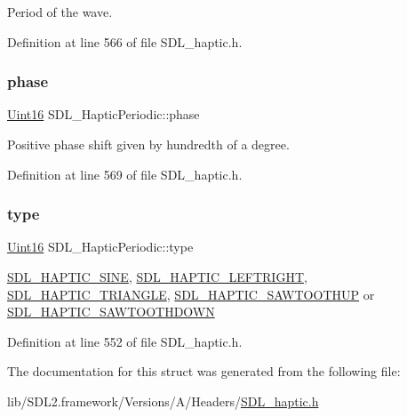 Period of the wave. 

Definition at line 566 of file S\+D\+L\+\_\+haptic.\+h.

\mbox{\label{struct_s_d_l___haptic_periodic_a25e8c6aebc78bd74b9343fa228d25d8f}} 
\subsubsection{\texorpdfstring{phase}{phase}}
{\footnotesize\ttfamily \mbox{\hyperlink{_s_d_l__stdinc_8h_a31fcc0a076c9068668173ee26d33e42b}{Uint16}} S\+D\+L\+\_\+\+Haptic\+Periodic\+::phase}

Positive phase shift given by hundredth of a degree. 

Definition at line 569 of file S\+D\+L\+\_\+haptic.\+h.

\mbox{\label{struct_s_d_l___haptic_periodic_ac53c5725e8cff012e9b90e01b7110869}} 
\subsubsection{\texorpdfstring{type}{type}}
{\footnotesize\ttfamily \mbox{\hyperlink{_s_d_l__stdinc_8h_a31fcc0a076c9068668173ee26d33e42b}{Uint16}} S\+D\+L\+\_\+\+Haptic\+Periodic\+::type}

\mbox{\hyperlink{_s_d_l__haptic_8h_aa6d75adbfcdda5075078e7a2849da5c0}{S\+D\+L\+\_\+\+H\+A\+P\+T\+I\+C\+\_\+\+S\+I\+NE}}, \mbox{\hyperlink{_s_d_l__haptic_8h_ae047624d8458ff6400887c37a36f86d3}{S\+D\+L\+\_\+\+H\+A\+P\+T\+I\+C\+\_\+\+L\+E\+F\+T\+R\+I\+G\+HT}}, \mbox{\hyperlink{_s_d_l__haptic_8h_ae8123eaa51511507375ba6ef9220fa46}{S\+D\+L\+\_\+\+H\+A\+P\+T\+I\+C\+\_\+\+T\+R\+I\+A\+N\+G\+LE}}, \mbox{\hyperlink{_s_d_l__haptic_8h_ab8e3f40f3c2bcee8905d13b634363c3f}{S\+D\+L\+\_\+\+H\+A\+P\+T\+I\+C\+\_\+\+S\+A\+W\+T\+O\+O\+T\+H\+UP}} or \mbox{\hyperlink{_s_d_l__haptic_8h_afd64aa747034a7ccf4b55f6246525701}{S\+D\+L\+\_\+\+H\+A\+P\+T\+I\+C\+\_\+\+S\+A\+W\+T\+O\+O\+T\+H\+D\+O\+WN}} 

Definition at line 552 of file S\+D\+L\+\_\+haptic.\+h.



The documentation for this struct was generated from the following file\+:\begin{DoxyCompactItemize}
\item 
lib/\+S\+D\+L2.\+framework/\+Versions/\+A/\+Headers/\mbox{\hyperlink{_s_d_l__haptic_8h}{S\+D\+L\+\_\+haptic.\+h}}\end{DoxyCompactItemize}
